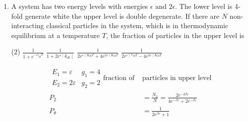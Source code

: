 \begin{enumerate}
\begin{answer}
	\begin{align*}
	F&=K_{B} T \ln \left[\frac{a_{O} V\left(K_{B} T\right)^{5 / 2}}{N}\right]^{N}\\
	F&= K_{B}+\ln z
	\intertext{compare 1 and 2, we get }
	\ln z&=-\ln \left[\frac{a_{0} V\left(K_{B} T\right)^{5 / 2}}{N}\right]^{N} \\
	\langle u\rangle&=-\frac{\partial}{\partial \beta} \ln z=+K T^{2} \frac{\partial}{\partial T} \ln z\\
	\langle u\rangle&=N K_{B} T^{2} \frac{\partial}{\partial T}\left(-\ln \left(\frac{a_{O} V\left(K_{B} T\right)^{5 / 2}}{N}\right)\right)\\
	&=N K_{B} T^{2} \frac{\partial}{\partial T}\left[-\ln T^{5 / 2}-\ln \left(\frac{a_{0} \cup K_{B}}{N}\right)\right]\\
	&=-\frac{5}{2} N K_{B} T^{2} \times \frac{1}{T} \\
	&=-\frac{5}{2} N K_{B} T
	\end{align*}
	So the correct answer is \textbf{Option (b)}
\end{answer}
\item A system has two energy levels with energies $\epsilon \text{ and }2\epsilon$. The lower level is 4-fold generate white the upper level is double degenerate. If there are $N$ non-interacting classical particles in the system, which is in thermodynamic equilibrium at a temperature $T$, the fraction of particles in the upper level is 
 \begin{tasks}(2)
	\task[\textbf{a.}] $\frac{1}{1+e^{-\left.\varepsilon\right|_{B} T}}$
	\task[\textbf{b.}] $\frac{1}{1+2 e^{\varepsilon \mid} k_{B} \mid}$
	\task[\textbf{c.}]$\frac{1}{2 e^{\varepsilon \mid K_{B} T}+4 e^{2 \varepsilon \mid K_{B} T}}$
	\task[\textbf{d.}] $\frac{1}{2 e^{\varepsilon \mid \forall_{B} T}-4 e^{2 \varepsilon \mid K_{B} T}}$
\end{tasks}
\begin{answer}
	\begin{align*}
	\begin{array}{ll}
	E_{1}=\varepsilon & g_{1}=4 \\
	E_{2}=2 \varepsilon & g_{2}=2
	\end{array}
	\text{fraction of }&\text{particles in upper level}\\
	P_{2}&=\frac{N_{2}}{N}=\frac{2 e^{-2 \beta \varepsilon}}{4 e^{-\beta \varepsilon}+2 e^{-\beta \varepsilon}}\\
	P_{\theta}&=\frac{1}{2 e^{\beta \varepsilon}+1}
	\end{align*}

\end{answer}
\end{enumerate}
